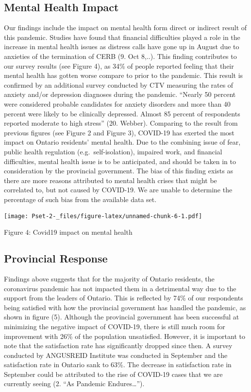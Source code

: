\documentclass[
]{article}
\begin{document}
\hypertarget{mental-health-impact}{%
\subsection{Mental Health Impact}\label{mental-health-impact}}

Our findings include the impact on mental health form direct or indirect
result of this pandemic. Studies have found that financial difficulties
played a role in the increase in mental health issues as distress calls
have gone up in August due to anxieties of the termination of CERB (9.
Oct 8,..). This finding contributes to our survey results (see Figure
4), as 34\% of people reported feeling that their mental health has
gotten worse compare to prior to the pandemic. This result is confirmed
by an additional survey conducted by CTV measuring the rates of anxiety
and/or depression diagnoses during the pandemic. ``Nearly 50 percent
were considered probable candidates for anxiety disorders and more than
40 percent were likely to be clinically depressed. Almost 85 percent of
respondents reported moderate to high stress'' (20. Webber). Comparing
to the result from previous figures (see Figure 2 and Figure 3),
COVID-19 has exerted the most impact on Ontario residents' mental
health. Due to the combining issue of fear, public health regulation
(e.g.~self-isolation), impaired work, and financial difficulties, mental
health issue is to be anticipated, and should be taken in to
consideration by the provincial government. The bias of this finding
exists as there are more reasons attributed to mental health crises that
might be correlated to, but not caused by COVID-19. We are unable to
determine the percentage of such bias from the available data set.

\texttt{[image: Pset-2-\_files/figure-latex/unnamed-chunk-6-1.pdf]}

Figure 4: Covid19 impact on mental health

\hypertarget{provincial-response}{%
\subsection{Provincial Response}\label{provincial-response}}

Findings above suggests that for the majority of Ontario residents, the
coronavirus pandemic has not impacted them in a detrimental way due to
the support from the leaders of Ontario. This is reflected by 74\% of
our respondents being satisfied with how the provincial government has
handled the pandemic, as shown in figure (5). Although the provincial
government has been successful at minimizing the negative impact of
COVID-19, there is still much room for improvement with 26\% of the
population unsatisfied. However, it is important to note that the
satisfaction rate has significantly dropped since then. A survey
conducted by ANGUSREID Institute was conducted in September and the
satisfaction rate in Ontario sank to 63\%. The decrease in satisfaction
rate in September could be attributed to the rise of COVID-19 cases that
we are currently seeing (2. ``As Pandemic Endures\ldots{}'').
\end{document}
